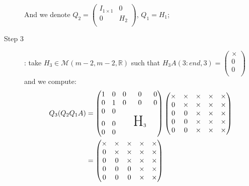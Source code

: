 \documentclass[ComputationalMathematics.tex]{subfiles}
\begin{document}
\begin{example}
\begin{description}
    And we denote $Q_{2} =\begin{pmatrix}
        I_{1 \times 1} & 0\\
        0 & H_{2}\\
      \end{pmatrix}$, $Q_{1}=H_1$;
  \item[{\sc Step 3}]: take $H_{3} \in \mathcal{M}(m-2, m-2, \mathds{R})$ such that $H_{3}A(3:end, 3) = \begin{pmatrix} \times\\ 0\\ 0\\ \end{pmatrix}$
      and we compute:
      \begin{equation}
        \begin{aligned}
          Q_3 (Q_2 Q_1 A)
          &=  \begin{pmatrix}
          1 & 0 & 0 & 0 & 0\\
          0 & 1 & 0 & 0 & 0\\
          0 & 0 & & \\
          0 & 0 && \text{\huge H}_3\\
          0 & 0 &&\\
        \end{pmatrix} 
        \begin{pmatrix}
          \times & \times & \times & \times & \times\\
          0 & \times & \times & \times & \times\\
          0 & 0 & \times & \times & \times\\
          0 & 0 & \times & \times & \times\\
          0 & 0 & \times & \times & \times\\
        \end{pmatrix}\\
        &= \begin{pmatrix}
          \times & \times & \times & \times & \times\\
          0 & \times & \times & \times & \times\\
          0 & 0 & \times & \times & \times\\
          0 & 0 & 0 & \times & \times\\
          0 & 0 & 0 & \times & \times\\
        \end{pmatrix}
        \end{aligned}
      \end{equation}


\end{description}
\end{example}
\end{document}
